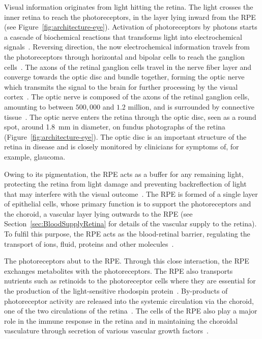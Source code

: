 \documentclass{article}
\begin{document}
Visual information originates from light hitting the retina.
The light crosses the inner retina to reach the photoreceptors, in the layer lying inward from the RPE (see Figure~\ref{fig:architecture-eye}).
Activation of photoreceptors by photons starts a cascade of biochemical reactions that transforms light into electrochemical signals~\cite{Casper_2019, Hurley_2009}.
Reversing direction, the now electrochemical information travels from the photoreceptors through horizontal and bipolar cells to reach the ganglion cells~\cite{Casper_2019, Mahabadi_2022}.
The axons of the retinal ganglion cells travel in the nerve fiber layer and converge towards the optic disc and bundle together, forming the optic nerve which transmits the signal to the brain for further processing by the visual cortex~\cite{Casper_2019}.
The optic nerve is composed of the axons of the retinal ganglion cells, amounting to between $500,000$ and $1.2$ million, and is surrounded by connective tissue~\cite{Salazar_2019}.
The optic nerve enters the retina through the optic disc, seen as a round spot, around \SI{1.8}{\mm} in diameter, on fundus photographs of the retina (Figure~\ref{fig:architecture-eye}).
The optic disc is an important structure of the retina in disease and is closely monitored by clinicians for symptoms of, for example, glaucoma.

Owing to its pigmentation, the RPE acts as a buffer for any remaining light, protecting the retina from light damage and preventing backreflection of light that may interfere with the visual outcome~\cite{Boulton_2001}.
The RPE is formed of a single layer of epithelial cells, whose primary function is to support the photoreceptors and the choroid, a vascular layer lying outwards to the RPE (see Section~\ref{sec:BloodSupplyRetina} for details of the vascular supply to the retina).
To fulfil this purpose, the RPE acts as the blood-retinal barrier, regulating the transport of ions, fluid, proteins and other molecules~\cite{Boulton_2001}.

The photoreceptors abut to the RPE.
Through this close interaction, the RPE exchanges metabolites with the photoreceptors.
The RPE also transports nutrients such as retinoids to the photoreceptor cells where they are essential for the production of the light-sensitive rhodospin protein~\cite{Boulton_2001}.
By-products of photoreceptor activity are released into the systemic circulation via the choroid, one of the two circulations of the retina~\cite{Boulton_2001}.
The cells of the RPE also play a major role in the immune response in the retina and in maintaining the choroidal vasculature through secretion of various vascular growth factors~\cite{Boulton_2001,Detrick_2020}.
\end{document}

